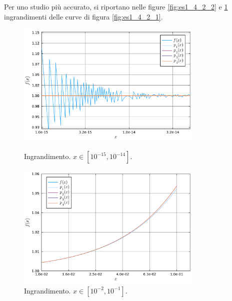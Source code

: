 \documentclass[letterpaper, 12pt]{article}
\numberwithin{equation}{section}    %
\begin{document}
Per uno studio più accurato, si riportano nelle figure \ref{fig:es1_4_2_2} e \ref{fig:es1_4_2_3} ingrandimenti 
delle curve di figura \ref{fig:es1_4_2_1}.
\begin{figure}[!ht]
    \centering
    \begin{minipage}[b]{0.49\textwidth}
        \centering
        \includegraphics[width=0.8\textwidth]{1422.pdf}
        \caption{Ingrandimento. $x \in [10^{-15}, 10^{-14}]$.}
        \label{fig:es1_4_2_2}
    \end{minipage}
    \hfill
    \begin{minipage}[b]{0.49\textwidth}
        \centering
        \includegraphics[width=0.8\textwidth]{1423.pdf}
        \caption{Ingrandimento. $x \in [10^{-2}, 10^{-1}]$.}
        \label{fig:es1_4_2_3}
    \end{minipage}
\end{figure}
\end{document}
